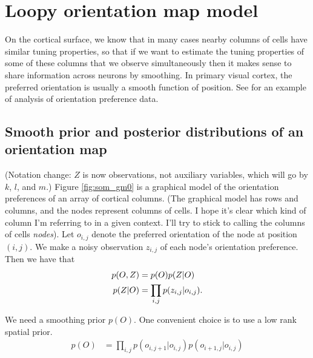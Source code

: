 \documentclass[11pt]{article}
\newcommand{\paperlink}[1]{\href{Documents/papers/#1.pdf}{\cite{#1}}}
\begin{document}
\section{Loopy orientation map model}
\label{sec:loopy_orientation_map_model}

On the cortical surface, we know that in many cases nearby columns of cells have similar tuning properties, so that if we want to estimate the tuning properties of some of these columns that we observe simultaneously then it makes sense to share information across neurons by smoothing.  In primary visual cortex, the preferred orientation is usually a smooth function of position. See \paperlink{Ohki_2006} for an example of analysis of orientation preference data. 

\subsection{Smooth prior and posterior distributions of an orientation map}

(Notation change: $Z$ is now observations, not auxiliary variables, which will go by $k$, $l$, and $m$.) Figure \ref{fig:som_gm0} is a graphical model of the orientation preferences of an array of cortical columns.  (The graphical model has rows and columns, and the nodes represent columns of cells. I hope it's clear which kind of column I'm referring to in a given context. I'll try to stick to calling the columns of cells {\it nodes}). Let $o_{i,j}$ denote the preferred orientation of the node at position $(i,j)$.  We make a noisy observation $z_{i,j}$ of each node's orientation preference. Then we have that
%
\begin{align}
p(O,Z) &= p(O) p(Z|O) \notag \\
p(Z|O) &= \prod_{i,j} p( z_{i,j} | o_{i,j} ).
\end{align}

We need a smoothing prior $p(O)$. One convenient choice is to use a low rank spatial prior.
%
\begin{align}
p(O) &= \prod_{i,j} p(o_{i,j+1}|o_{i,j}) p(o_{i+1,j}|o_{i,j})
\end{align}
\end{document}
